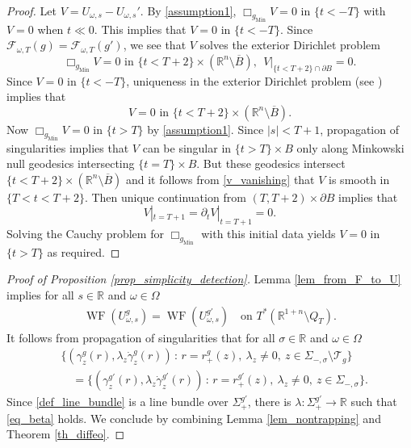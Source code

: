 \documentclass[11pt,letterpaper]{amsart}
\theoremstyle{definition}
\numberwithin{equation}{section}
\newcommand{\mR}{\mathbb{R}}                    %
\newcommand{\ol}[1]{\overline{#1}}
\newcommand{\p}{\partial}
\newcommand{\gm}{g_{\mathrm{Min}}}
\def\p{\partial}
\def\R{\mathbb R}
\DeclareMathOperator{\WF}{WF}
\def\mid{\,:\,}
\begin{document}
\begin{proof}
Let $V = U_{\omega,s}-U_{\omega,s}'$. By \eqref{assumption1}, $\Box_{\gm} V = 0$ in $\{t < -T \}$ with $V = 0$ when $t \ll 0$. This implies that $V = 0$ in $\{ t < -T \}$. Since $\mathcal{F}_{\omega,T}(g) = \mathcal{F}_{\omega,T}(g')$, we see that $V$ solves the exterior Dirichlet problem 
\[
\Box_{\gm} V = 0 \text{ in $\{ t < T+2 \} \times (\mR^n \setminus \ol{B})$}, \ \ V|_{\{ t < T+2 \} \cap \p B} = 0.
\]
Since $V = 0$ in $\{ t < -T \}$, uniqueness in the exterior Dirichlet problem (see \cite[Lemma 6.1]{oksanen2024}) implies that 
\begin{equation} \label{v_vanishing}
V = 0 \text{ in $\{ t < T+2 \} \times (\mR^n \setminus \ol{B})$}.
\end{equation}
Now $\Box_{\gm} V = 0$ in $\{ t > T \}$ by \eqref{assumption1}. Since $|s| < T + 1$, propagation of singularities implies that $V$ can be singular in $\{ t > T \} \times B$ only along Minkowski null geodesics intersecting $\{ t = T \} \times B$. But these geodesics intersect $\{ t < T+2 \} \times (\mR^n \setminus \ol{B})$ and it follows from \eqref{v_vanishing} that $V$ is smooth in $\{ T < t < T+2 \}$. Then unique continuation from $(T, T+2) \times \p B$ implies that 
\[
V|_{t=T+1} = \p_t V|_{t=T+1} = 0.
\]
Solving the Cauchy problem for $\Box_{\gm}$ with this initial data yields $V = 0$ in $\{ t > T \}$ as required.
\end{proof}

\begin{proof}[Proof of Proposition \ref{prop_simplicity_detection}]
Lemma \ref{lem_from_F_to_U} implies for all $s \in \R$ and $\omega \in \Omega$
    \begin{align*}
\WF(U_{\omega, s}^{g}) = \WF(U_{\omega, s}^{g'})
\quad \text{on $T^* (\R^{1+n} \setminus Q_T)$}.
    \end{align*}
It follows from propagation of singularities that for all $\sigma \in \R$ and $\omega \in \Omega$
    \begin{align*}
&\{(\gamma_z^g(r), \lambda_z \dot \gamma_z^g(r)) \mid r=r_+^g(z),\ \lambda_z \ne 0, \ z \in \Sigma_{-,\sigma} \setminus \mathcal{T}_{g}\}
\\&\quad=
\{(\gamma_z^{g'}(r), \lambda_z \dot \gamma_z^{g'}(r)) \mid r=r_+^{g'}(z),\ \lambda_z \ne 0, \ z \in \Sigma_{-,\sigma}\}.
    \end{align*}
Since \eqref{def_line_bundle} is a line bundle over $\Sigma_{+}^{g'}$, there is $\lambda : \Sigma_+^{g'} \to \R$ such that \eqref{eq_beta} holds.
We conclude by combining Lemma \ref{lem_nontrapping} and Theorem \ref{th_diffeo}.
\end{proof}
\end{document}
